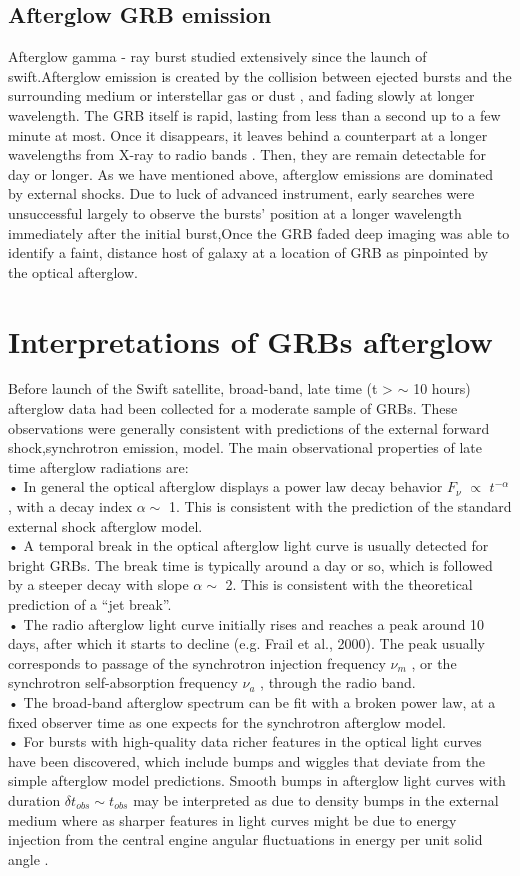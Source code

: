 \subsection{Afterglow GRB emission}
Afterglow gamma - ray burst studied  extensively since the launch of swift.Afterglow  emission is created by the collision between ejected bursts and the surrounding medium or interstellar gas or dust , and fading slowly at longer wavelength. The GRB itself is rapid, lasting from less than a second up to a few minute at most. Once it disappears, it leaves behind a counterpart at a longer wavelengths from X-ray to radio bands . Then, they are remain detectable for day or longer. As we have mentioned above, afterglow emissions are dominated by external shocks. Due to luck of advanced instrument, early searches were unsuccessful largely to observe the bursts’ position at a longer wavelength immediately after the initial burst,Once the GRB faded deep imaging was able to identify a faint, distance host of galaxy at a location of GRB as pinpointed by the optical afterglow.\citep{15}\citep{22}\citep{23} 
\section{Interpretations of GRBs afterglow }
Before launch of the Swift satellite, broad-band, late time (t > $ \sim $ 10 hours) afterglow data had been collected for a moderate sample of GRBs. These observations were generally consistent with predictions of the external forward shock,synchrotron emission, model. The main observational properties of late time afterglow radiations are:\\
• In general the optical afterglow displays a power law decay behavior $ F_{\nu} $ $ \propto $ $ t^{-\alpha} $   , with a decay index $ \alpha \sim $ 1. This is consistent with the prediction of the standard external shock afterglow model.\\
• A temporal break in the optical afterglow light curve is usually detected for bright GRBs. The break time is typically around a day or so, which is followed by a steeper decay with slope $ \alpha  \sim $ 2. This is consistent with the theoretical prediction of a “jet break”.\\
• The radio afterglow light curve initially rises and reaches a peak around
10 days, after which it starts to decline (e.g. Frail et al., 2000). The peak
usually corresponds to passage of the synchrotron injection frequency $ \nu_{m} $ ,
or the synchrotron self-absorption frequency $ \nu_{a} $ , through the radio band.\\
• The broad-band afterglow spectrum can be fit with a broken power law, at
a fixed observer time as one expects for the synchrotron afterglow model.\\
• For bursts with high-quality data richer features in the optical light curves have been discovered, which include bumps and wiggles that deviate from the simple afterglow model predictions. Smooth bumps in afterglow light curves with duration $ \delta  t _{obs}  \sim  t_{obs} $ may be interpreted as due to density bumps in the external medium  where as sharper features in light curves might be due to energy injection from the central engine  angular fluctuations in energy per unit solid angle \citep{18}.

